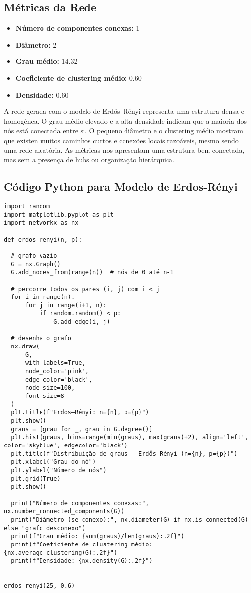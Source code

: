 \documentclass{article}
\begin{document}
\subsection*{Métricas da Rede}

\begin{itemize}
    \item \textbf{Número de componentes conexas:} 1
    \item \textbf{Diâmetro:} 2
    \item \textbf{Grau médio:} 14.32
    \item \textbf{Coeficiente de clustering médio:} 0.60
    \item \textbf{Densidade:} 0.60
\end{itemize}

A rede gerada com o modelo de Erdős–Rényi representa uma estrutura densa e homogênea. O grau médio elevado e a alta densidade indicam que a maioria dos nós está conectada entre si. O pequeno diâmetro e o clustering médio mostram que existen muitos caminhos curtos e conexões locais razoáveis, mesmo sendo uma rede aleatória. As métricas nos apresentam uma estrutura bem conectada, mas sem a presença de hubs ou organização hierárquica.

\newpage

\subsection{Código Python para Modelo de Erdos-Rényi}

\begin{verbatim}
import random
import matplotlib.pyplot as plt
import networkx as nx

def erdos_renyi(n, p):

  # grafo vazio
  G = nx.Graph()
  G.add_nodes_from(range(n))  # nós de 0 até n-1

  # percorre todos os pares (i, j) com i < j
  for i in range(n):
      for j in range(i+1, n):
          if random.random() < p:
              G.add_edge(i, j)

  # desenha o grafo
  nx.draw(
      G,
      with_labels=True,
      node_color='pink',
      edge_color='black',
      node_size=100,
      font_size=8
  )
  plt.title(f"Erdos–Rényi: n={n}, p={p}")
  plt.show()
  graus = [grau for _, grau in G.degree()]
  plt.hist(graus, bins=range(min(graus), max(graus)+2), align='left', color='skyblue', edgecolor='black')
  plt.title(f"Distribuição de graus — Erdős–Rényi (n={n}, p={p})")
  plt.xlabel("Grau do nó")
  plt.ylabel("Número de nós")
  plt.grid(True)
  plt.show()

  print("Número de componentes conexas:", nx.number_connected_components(G))
  print("Diâmetro (se conexo):", nx.diameter(G) if nx.is_connected(G) else "grafo desconexo")
  print(f"Grau médio: {sum(graus)/len(graus):.2f}")
  print(f"Coeficiente de clustering médio: {nx.average_clustering(G):.2f}")
  print(f"Densidade: {nx.density(G):.2f}")


erdos_renyi(25, 0.6)
\end{verbatim}
\end{document}
